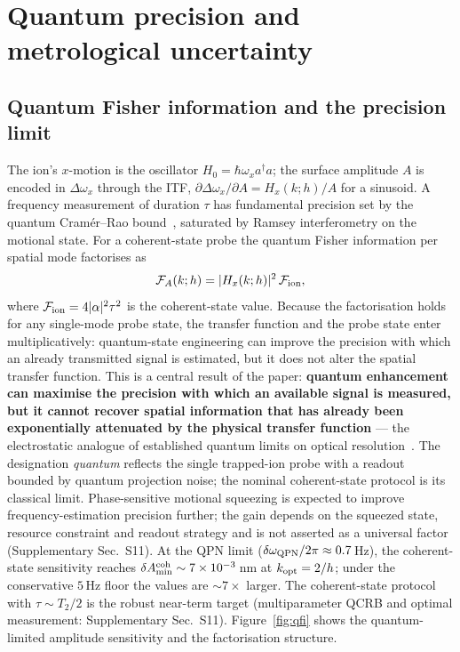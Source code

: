 \documentclass[12pt,a4paper]{article}
\begin{document}
\section{Quantum precision and metrological uncertainty}
\label{sec:precision}

\subsection{Quantum Fisher information and the precision limit}

The ion's $x$-motion is the oscillator $H_0=\hbar\omega_x a^\dagger a$;
the surface amplitude $A$ is encoded in $\Delta\omega_x$ through the ITF,
$\partial\Delta\omega_x/\partial A=H_x(k;h)/A$ for a sinusoid.  A
frequency measurement of duration $\tau$ has fundamental precision set by
the quantum Cram\'er--Rao bound~\cite{giovannetti2011advances,degen2017quantum},
saturated by Ramsey interferometry on the motional state.  For a
coherent-state probe the quantum Fisher information per spatial mode
factorises as
\begin{equation}
\mathcal{F}_A(k;h) = |H_x(k;h)|^2 \, \mathcal{F}_{\rm ion},
\label{eq:FQ_factorisation}
\end{equation}
where $\mathcal{F}_{\rm ion}=4|\alpha|^2\tau^2$ is the coherent-state
value.  Because the factorisation holds for any single-mode probe state,
the transfer function and the probe state enter multiplicatively:
quantum-state engineering can improve the precision with which an
already transmitted signal is estimated, but it does not alter the
spatial transfer function.  This is a central result of the paper:
\textbf{quantum enhancement can maximise the precision with which an
available signal is measured, but it cannot recover spatial
information that has already been exponentially attenuated by the
physical transfer function} --- the electrostatic analogue of
established quantum limits on optical
resolution~\cite{kolobov2000quantum}.  The designation \emph{quantum}
reflects the single trapped-ion probe with a readout bounded by quantum
projection noise; the nominal coherent-state protocol is its classical
limit.
Phase-sensitive motional squeezing is
expected to improve frequency-estimation precision further; the gain
depends on the squeezed state, resource constraint and readout strategy
and is not asserted as a universal factor (Supplementary Sec.~S11).  At the QPN limit
($\delta\omega_{\rm QPN}/2\pi\approx0.7$\,Hz), the coherent-state
sensitivity reaches $\delta A_{\min}^{\rm coh}\sim7\times10^{-3}$\,nm at
$k_{\rm opt}=2/h$; under the conservative $5$\,Hz floor the values are
${\sim}7\times$ larger.  The coherent-state protocol with
$\tau\sim T_2/2$ is the robust near-term target (multiparameter QCRB and
optimal measurement: Supplementary Sec.~S11).
Figure~\ref{fig:qfi} shows the quantum-limited amplitude sensitivity and
the factorisation structure.
\end{document}
